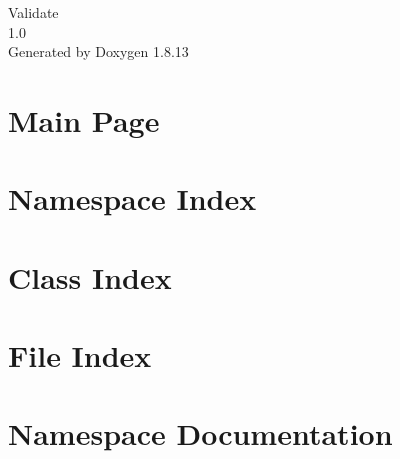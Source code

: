 \documentclass[twoside]{book}
\newcommand{\+}{\discretionary{\mbox{\scriptsize$\hookleftarrow$}}{}{}}
\newcommand{\clearemptydoublepage}{%
  \newpage{\pagestyle{empty}\cleardoublepage}%
}
\begin{document}
\hypersetup{pageanchor=false,
             bookmarksnumbered=true,
             pdfencoding=unicode
            }
\begin{titlepage}
\vspace*{7cm}
\begin{center}%
{\Large Validate \\[1ex]\large 1.\+0 }\\
\vspace*{1cm}
{\large Generated by Doxygen 1.8.13}\\
\end{center}
\end{titlepage}
\clearemptydoublepage
{}
\tableofcontents
\clearemptydoublepage
{}
\hypersetup{pageanchor=true}

\chapter{Main Page}
\label{index}\hypertarget{index}{}
\chapter{Namespace Index}

\chapter{Class Index}

\chapter{File Index}

\chapter{Namespace Documentation}

\end{document}
